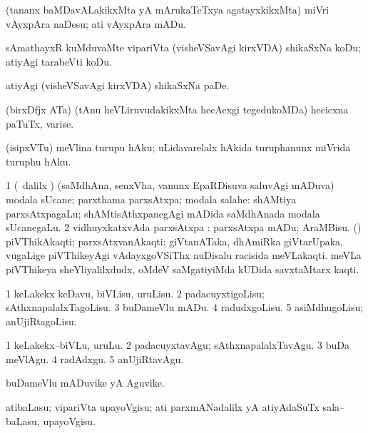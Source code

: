 \bentry
{}
\gl{\sakirx}
\bmng
(tananx baMDavALakikxMta yA mArukaTeTxya agatayxkikxMta) miVri vAyxpAra naDesu; ati vAyxpAra mADu. 
\emng
\eentry

\bentry
{}
\gl{\sakirx}
\bmng
sAmathayxR kuMduvaMte vipariVta (visheVSavAgi kirxVDA) shikaSxNa koDu; atiyAgi tarabeVti koDu. 
\emng

\noindent
\gl{\akirx}
\bmng
atiyAgi (visheVSavAgi kirxVDA) shikaSxNa paDe. 
\emng
\eentry

\bentry
{}
\gl{\nA}
\bmng
(birxDfjx ATa) (tAnu heVLiruvudakikxMta hecAcxgi tegedukoMDa) hecicxna paTuTx, varise. 
\emng
\eentry

\bentry
{}
\gl{\sakirx}
\bmng
(isipxVTu) meVlina turupu hAku; uLidavarelalx hAkida turuphanunx miVrida turuphu hAku. 
\emng
\eentry

\bentry
{}
\gl{\nA}
\bmng
\bnum
\num{1} (\sA\ \bava dalilx \parx) (saMdhAna, senxVha, \mo vanunx EpaRDisuva saluvAgi mADuva) modala sUcane; parxthama parxsAtxpa; modala salahe:  shAMtiya parxsAtxpagaLu; shAMtisAthxpanegAgi mADida saMdhAnada modala sUcanegaLu. 
\num{2} vidhuyxkatxvAda parxsAtxpa :  parxsAtxpa mADu; AraMBisu. 
 (\saM) 
\banum
{} piVThikAkaqti; parxsAtxvanAkaqti; giVtanATaka, dhAmiRka giVtarUpaka, \mo vugaLige piVThikeyAgi vAdayxgoVSiThx nuDisalu racisida meVLakaqti. 
 meVLa piVThikeya sheYliyalilxdudx, oMdeV saMgatiyiMda kUDida savxtaMtarx kaqti. 
\eanum
\numie
\enum
\emng
\eentry

\bentry
{}
\gl{\sakirx}
\bmng
\bnum
\num{1} keLakekx keDavu, biVLisu, uruLisu. 
\num{2} padacuyxtigoLisu; sAthxnapalalxTagoLisu. 
\num{3} buDameVlu mADu. 
\num{4} radudxgoLisu. 
\num{5} asiMdhugoLisu; anUjiRtagoLisu. 
\enum
\emng

\noindent
\gl{\akirx}
\bmng
\bnum
\num{1} keLakekx--biVLu, uruLu. 
\num{2} padacuyxtavAgu; sAthxnapalalxTavAgu. 
\num{3} buDa meVlAgu. 
\num{4} radAdxgu. 
\num{5} anUjiRtavAgu. 
\enum
\emng
\eentry

\bentry
{}
\gl{\nA}
\bmng
buDameVlu mADuvike yA Aguvike. 
\emng
\eentry

\bentry
{}
\gl{\sakirx}
\bmng
atibaLasu; vipariVta upayoVgisu; ati parxmANadalilx yA atiyAdaSuTx sala--baLasu, upayoVgisu. 
\emng
\eentry

